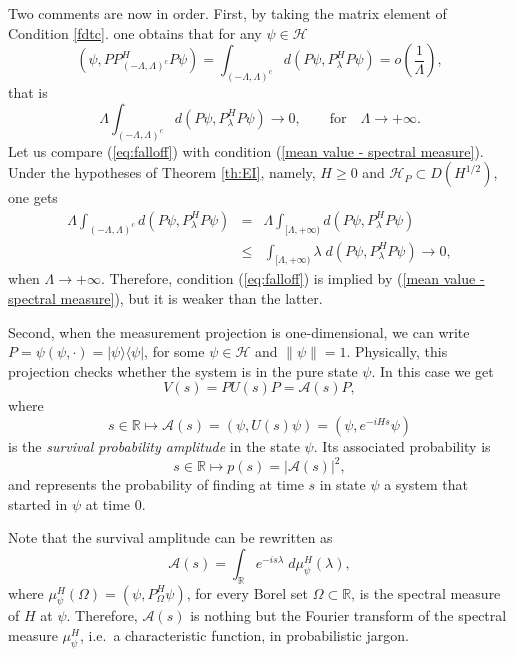 \documentclass[aip,jmp,12pt
]{revtex4}
\newcommand{\RM}{\mathbb{R}}
\theoremstyle{definition}
\begin{document}
Two comments are now in order. First, by taking the matrix element of Condition \ref{fdtc}. one obtains that for any $\psi\in\mathcal{H}$
\[
(\psi, P
P_{(-\Lambda,\Lambda)^c}^H P\psi) 
= \int_{(-\Lambda,\Lambda)^c}  d (P\psi,P^H_\lambda P\psi) = o\left( \frac{1}{\Lambda} \right),
\]
that is
\begin{equation}
\label{eq:falloff}
\Lambda \int_{(-\Lambda,\Lambda)^c}  d (P\psi,P^H_\lambda P\psi)
\to 0, \qquad \text{for}\quad \Lambda\to +\infty.
\end{equation}
Let us compare (\ref{eq:falloff}) with condition (\ref{mean value - spectral measure}). Under the hypotheses of Theorem \ref{th:EI}, namely, $H\geq0$ and $\mathcal{H}_P\subset D(H^{1/2})$, one gets
\begin{eqnarray*}
\Lambda \int_{(-\Lambda,\Lambda)^c}  d (P\psi,P^H_\lambda P\psi) &=&
\Lambda \int_{[\Lambda,+\infty)}  d (P\psi,P^H_\lambda P\psi)
\\
&\leq&  \int_{[\Lambda,+\infty)} \lambda\; d (P\psi,P^H_\lambda P\psi) \to 0,
\end{eqnarray*}
when $\Lambda\to+\infty$. Therefore, condition (\ref{eq:falloff}) is implied by (\ref{mean value - spectral measure}), but it is weaker than the latter.



Second, when the measurement projection is
one-dimensional, we can write $P=\psi
(\psi,\cdot)=|\psi\rangle\langle\psi|$, for some
$\psi\in\mathcal{H}$ and $\|\psi\|=1$. Physically, this projection checks whether the system is in the pure state $\psi$. In this case we get
\begin{equation}
\label{eq:VsAs}
V(s)=P U(s) P=\mathcal{A}(s) P,
\end{equation}
where
\[
 s \in \RM \mapsto \mathcal{A}(s) = (\psi, U(s) \psi)= (\psi, e^{-i H s}\psi)
\]
is the \emph{survival probability amplitude} in the state $\psi$.
Its associated probability is
\[
 s \in \RM \mapsto p(s)=|\mathcal{A}(s)|^2,
\]
and represents the probability of finding  at time $s$ in state $\psi$ a system that started in $\psi$ at time $0$.

Note that the survival amplitude can be rewritten as
\[
\mathcal{A}(s) =
\int_{\RM} e^{-is\lambda}\; d\mu_{\psi}^H(\lambda),
\]
where $\mu_{\psi}^H(\Omega)=(\psi, P^H_{\Omega}\psi)$, for every Borel set $\Omega\subset\RM$, is the spectral measure of $H$ at $\psi$. Therefore, $\mathcal{A}(s)$ is nothing but the Fourier transform of the spectral measure $\mu_{\psi}^H$, i.e.\ a characteristic function, in probabilistic jargon.
\end{document}
